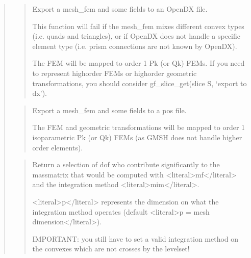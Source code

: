\documentclass[a4paper,11pt,english]{sphinxmanual}
\begin{document}
\begin{quote}
\begin{quote}
\sphinxAtStartPar
Export a mesh\_fem and some fields to an OpenDX file.

\sphinxAtStartPar
This function will fail if the mesh\_fem mixes different convex types
(i.e. quads and triangles), or if OpenDX does not handle a specific
element type (i.e. prism connections are not known by OpenDX).

\sphinxAtStartPar
The FEM will be mapped to order 1 Pk (or Qk) FEMs. If you need to
represent high\sphinxhyphen{}order FEMs or high\sphinxhyphen{}order geometric transformations,
you should consider gf\_slice\_get(slice S, ‘export to dx’).
\end{quote}

\sphinxAtStartPar
{}
\begin{quote}

\sphinxAtStartPar
Export a mesh\_fem and some fields to a pos file.

\sphinxAtStartPar
The FEM and geometric transformations will be mapped to order 1
isoparametric Pk (or Qk) FEMs (as GMSH does not handle higher
order elements).
\end{quote}

\sphinxAtStartPar
{}
\begin{quote}

\sphinxAtStartPar
Return a selection of dof who contribute significantly to the
mass\sphinxhyphen{}matrix that would be computed with \textless{}literal\textgreater{}mf\textless{}/literal\textgreater{} and the integration
method \textless{}literal\textgreater{}mim\textless{}/literal\textgreater{}.

\sphinxAtStartPar
\textless{}literal\textgreater{}p\textless{}/literal\textgreater{} represents the dimension on what the integration method
operates (default \textless{}literal\textgreater{}p = mesh dimension\textless{}/literal\textgreater{}).

\sphinxAtStartPar
IMPORTANT: you still have to set a valid integration method on
the convexes which are not crosses by the levelset!
\end{quote}

\sphinxAtStartPar
{}
\begin{quote}


\end{quote}
\end{quote}
\end{document}
